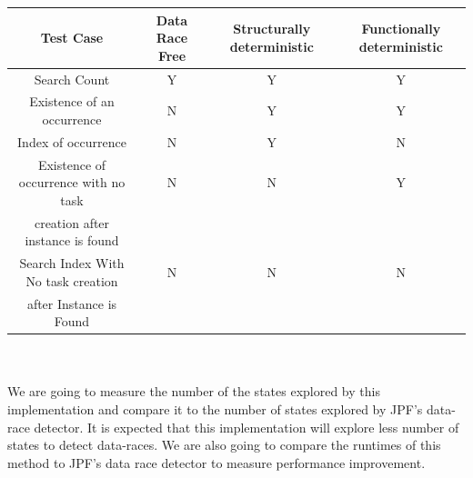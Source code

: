 \begin{tabular}{ | c | c | c | c |}
  \hline
  \textbf{Test Case} & \textbf{Data Race Free} & \textbf{Structurally deterministic} & \textbf{Functionally deterministic} \\
  \hline
  Search Count & Y & Y & Y \\
  \hline
  Existence of an occurrence & N & Y & Y \\
  \hline
  Index of occurrence & N & Y & N\\
  \hline
  Existence of occurrence with no task  & N & N & Y\\
  creation after instance is found & & & \\
  \hline
  Search Index With No task creation & N & N & N\\
   after Instance is Found  & & & \\
  \hline 
\end{tabular}
\\
\\
We are going to measure the number of the states explored by this implementation and compare it to the number of states explored by JPF's data-race detector. It is expected that this implementation will explore less number of states to detect data-races. We are also going to compare the runtimes of this method to JPF's data race detector to measure performance improvement.
